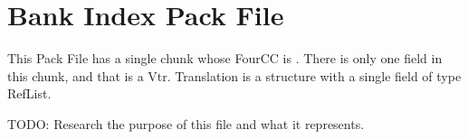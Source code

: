\section{Bank Index Pack File}
\label{sec:pfABIX}

This Pack File has a single chunk whose FourCC is .
There is only one field in this chunk, and that is a Vtr.
Translation is a structure with a single field of type RefList.

TODO: Research the purpose of this file and what it represents.

\clearpage

